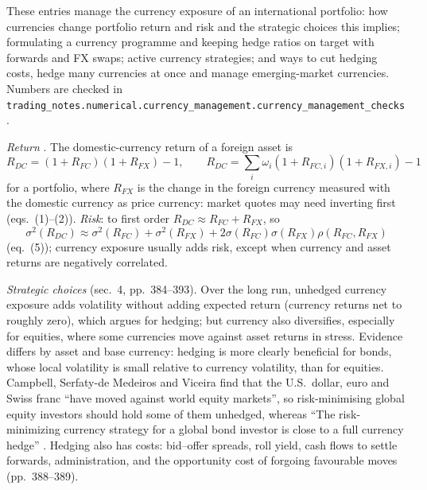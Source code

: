These entries manage the currency exposure of an international portfolio: how currencies change portfolio return and risk and the strategic choices this implies; formulating a currency programme and keeping hedge ratios on target with forwards and FX swaps; active currency strategies; and ways to cut hedging costs, hedge many currencies at once and manage emerging-market currencies. Numbers are checked in \nolinkurl{trading_notes.numerical.currency_management.currency_management_checks}.

\begin{qfmethod}\label{meth:currency-portfolio-effects}
 \emph{Return} \citep[chap.~8, sec.~3, pp.~378--383]{portfolio-management-in-practice-v1-2020}. The domestic-currency return of a foreign asset is
\[
R_{DC}=(1+R_{FC})(1+R_{FX})-1,\qquad R_{DC}=\sum_i\omega_i(1+R_{FC,i})(1+R_{FX,i})-1
\]
for a portfolio, where $R_{FX}$ is the change in the foreign currency measured with the domestic currency as price currency: market quotes may need inverting first (eqs.~(1)--(2)). \emph{Risk}: to first order $R_{DC}\approx R_{FC}+R_{FX}$, so
\[
\sigma^2(R_{DC})\approx\sigma^2(R_{FC})+\sigma^2(R_{FX})+2\sigma(R_{FC})\sigma(R_{FX})\rho(R_{FC},R_{FX})
\]
(eq.~(5)); currency exposure usually adds risk, except when currency and asset returns are negatively correlated.

\emph{Strategic choices} (sec.~4, pp.~384--393). Over the long run, unhedged currency exposure adds volatility without adding expected return (currency returns net to roughly zero), which argues for hedging; but currency also diversifies, especially for equities, where some currencies move against asset returns in stress. Evidence differs by asset and base currency: hedging is more clearly beneficial for bonds, whose local volatility is small relative to currency volatility, than for equities. Campbell, Serfaty-de Medeiros and Viceira find that the U.S.\ dollar, euro and Swiss franc ``have moved against world equity markets'', so risk-minimising global equity investors should hold some of them unhedged, whereas ``The risk-minimizing currency strategy for a global bond investor is close to a full currency hedge'' \citep[abstract]{campbell-viceira-currency-hedging-2007}. Hedging also has costs: bid--offer spreads, roll yield, cash flows to settle forwards, administration, and the opportunity cost of forgoing favourable moves (pp.~388--389).


\end{qfmethod}
